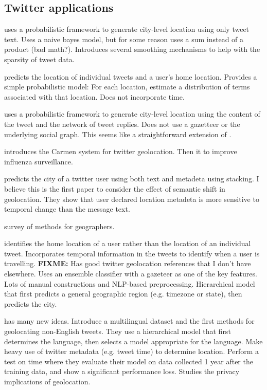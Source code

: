 \documentclass{article}
\newcommand{\fixme}[1]{\textbf{FIXME:} {#1}}
\begin{document}
\subsection{Twitter applications}

\citet{cheng2010you} uses a probabilistic framework to generate city-level location using only tweet text.
Uses a naive bayes model, but for some reason uses a sum instead of a product (bad math?).
Introduces several smoothing mechanisms to help with the sparsity of tweet data.

\citet{kinsella2011m} predicts the location of individual tweets and a user's home location.
Provides a simple probabilistic model: 
For each location, estimate a distribution of terms associated with that location.
Does not incorporate time.

\citet{li2012towards} uses a probabilistic framework to generate city-level location using the content of the tweet and the network of tweet replies.
Does not use a gazetteer or the underlying social graph.
This seems like a straightforward extension of \citet{cheng2010you}.

\citet{dredze2013carmen} introduces the Carmen system for twitter geolocation.
Then it to improve influenza surveillance.

\citet{han2013stacking} predicts the city of a twitter user using both text and metadeta using stacking.
I believe this is the first paper to consider the effect of semantic shift in geolocation.
They show that user declared location metadeta is more sensitive to temporal change than the message text.

\citet{graham2014world} survey of methods for geographers.

\citet{mahmud2014home} identifies the home location of a user rather than the location of an individual tweet.
Incorporates temporal information in the tweets to identify when a user is travelling.
\fixme{Has good twitter geolocation references that I don't have elsewhere.}
Uses an ensemble classifier with a gazeteer as one of the key features.
Lots of manual constructions and NLP-based preprocessing.
Hierarchical model that first predicts a general geographic region (e.g. timezone or state), then predicts the city.

\citet{han2014text} has many new ideas.
Introduce a multilingual dataset and the first methods for geolocating non-English tweets.
They use a hierarchical model that first determines the language,
then selects a model appropriate for the language.
Make heavy use of twitter metadata (e.g. tweet time) to determine location.
Perform a test on time where they evaluate their model on data collected 1 year after the training data, and show a significant performance loss.
Studies the privacy implications of geolocation.
\end{document}
